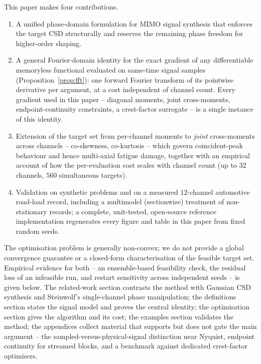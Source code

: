 \documentclass[10pt,a4paper]{article}
\numberwithin{equation}{section}
\begin{document}
This paper makes four contributions.
\begin{enumerate}
\item A unified phase-domain formulation for MIMO signal synthesis that enforces the target CSD structurally and reserves the remaining phase freedom for higher-order shaping.
\item A general Fourier-domain identity for the exact gradient of any differentiable memoryless functional evaluated on same-time signal samples (Proposition~\ref{prop:fft}): one forward Fourier transform of its pointwise derivative per argument, at a cost independent of channel count. Every gradient used in this paper -- diagonal moments, joint cross-moments, endpoint-continuity constraints, a crest-factor surrogate -- is a single instance of this identity.
\item Extension of the target set from per-channel moments to \emph{joint} cross-moments across channels -- co-skewness, co-kurtosis -- which govern coincident-peak behaviour and hence multi-axial fatigue damage, together with an empirical account of how the per-evaluation cost scales with channel count (up to $32$ channels, $560$ simultaneous targets).
\item Validation on synthetic problems and on a measured $12$-channel automotive road-load record, including a multimodel (sectionwise) treatment of non-stationary records; a complete, unit-tested, open-source reference implementation regenerates every figure and table in this paper from fixed random seeds.
\end{enumerate}

The optimisation problem is generally non-convex; we do not provide a global convergence guarantee or a closed-form characterisation of the feasible target set. Empirical evidence for both -- an ensemble-based feasibility check, the residual loss of an infeasible run, and restart sensitivity across independent seeds -- is given below. The related-work section contrasts the method with Gaussian CSD synthesis and Steinwolf's single-channel phase manipulation; the definitions section states the signal model and proves the central identity; the optimisation section gives the algorithm and its cost; the examples section validates the method; the appendices collect material that supports but does not gate the main argument -- the sampled-versus-physical-signal distinction near Nyquist, endpoint continuity for streamed blocks, and a benchmark against dedicated crest-factor optimisers.

\end{document}
